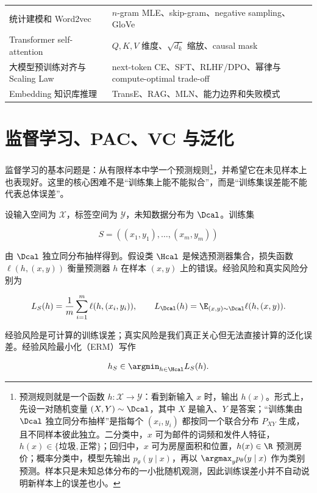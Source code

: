 \begin{longtable}{L{0.34\textwidth}L{0.34\textwidth}L{0.22\textwidth}}
统计建模和 Word2vec & \(n\)-gram MLE、skip-gram、negative sampling、GloVe & \cite{jurafsky2026slp,goldberg2017nnnlp} \\
Transformer self-attention & \(Q,K,V\) 维度、\(\sqrt{d_k}\) 缩放、causal mask & \cite{vaswani2017attention,jurafsky2026slp} \\
大模型预训练对齐与 Scaling Law & next-token CE、SFT、RLHF/DPO、幂律与 compute-optimal trade-off & \cite{kaplan2020scaling,hoffmann2022training,rafailov2023dpo} \\
Embedding 知识库推理 & TransE、RAG、MLN、能力边界和失败模式 & \cite{lewis2020rag,jurafsky2026slp} \\
\bottomrule
\end{longtable}
\endgroup

\section{监督学习、PAC、VC 与泛化}

\teaching
监督学习的基本问题是：从有限样本中学一个预测规则\footnote{预测规则就是一个函数 \(h:\mathcal{X}\to\mathcal{Y}\)：看到新输入 \(x\) 时，输出 \(h(x)\)。形式上，先设一对随机变量 \((X,Y)\sim\Dcal\)，其中 \(X\) 是输入、\(Y\) 是答案；“训练集由 \(\Dcal\) 独立同分布抽样”是指每个 \((x_i,y_i)\) 都按同一个联合分布 \(P_{XY}\) 生成，且不同样本彼此独立。二分类中，\(x\) 可为邮件的词频和发件人特征，\(h(x)\in\{\text{垃圾},\text{正常}\}\)；回归中，\(x\) 可为房屋面积和位置，\(h(x)\in\R\) 预测房价；概率分类中，模型先输出 \(p_\theta(y\mid x)\)，再以 \(\argmax_y p_\theta(y\mid x)\) 作为类别预测。样本只是未知总体分布的一小批随机观测，因此训练误差小并不自动说明新样本上的误差也小。}，并希望它在未见样本上也表现好。这里的核心困难不是“训练集上能不能拟合”，而是“训练集误差能不能代表总体误差”。

设输入空间为 \(\mathcal{X}\)，标签空间为 \(\mathcal{Y}\)，未知数据分布为 \(\Dcal\)。训练集

\[
  S=((x_1,y_1),\ldots,(x_m,y_m))
\]

由 \(\Dcal\) 独立同分布抽样得到。假设类 \(\Hcal\) 是候选预测器集合，损失函数 \(\ell(h,(x,y))\) 衡量预测器 \(h\) 在样本 \((x,y)\) 上的错误。经验风险和真实风险分别为

\[
  L_S(h)=\frac1m\sum_{i=1}^{m}\ell(h,(x_i,y_i)),
  \qquad
  L_{\Dcal}(h)=\E_{(x,y)\sim\Dcal}\ell(h,(x,y)).
\]

经验风险是可计算的训练误差；真实风险是我们真正关心但无法直接计算的泛化误差。经验风险最小化（ERM）写作

\[
  h_S\in \argmin_{h\in\Hcal}L_S(h).
\]

